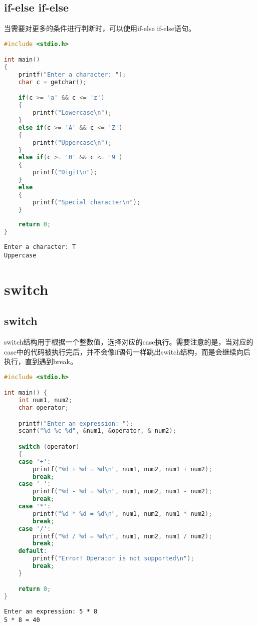 \vspace{0.5cm}

\subsection{if-else if-else}

当需要对更多的条件进行判断时，可以使用if-else if-else语句。\\


\begin{lstlisting}[language=C]
#include <stdio.h>

int main()
{
	printf("Enter a character: ");
	char c = getchar();

	if(c >= 'a' && c <= 'z')
	{
		printf("Lowercase\n");
	}
	else if(c >= 'A' && c <= 'Z')
	{
		printf("Uppercase\n");
	}
	else if(c >= '0' && c <= '9')
	{
		printf("Digit\n");
	}
	else
	{
		printf("Special character\n");
	}
	
	return 0;
}
\end{lstlisting}

\begin{tcolorbox}
	\begin{verbatim}
Enter a character: T
Uppercase
\end{verbatim}
\end{tcolorbox}

\newpage

\section{switch}

\subsection{switch}

switch结构用于根据一个整数值，选择对应的case执行。需要注意的是，当对应的case中的代码被执行完后，并不会像if语句一样跳出switch结构，而是会继续向后执行，直到遇到break。\\


\begin{lstlisting}[language=C]
#include <stdio.h>

int main() {
	int num1, num2;
	char operator;

	printf("Enter an expression: ");
	scanf("%d %c %d", &num1, &operator, & num2);

	switch (operator)
	{
	case '+':
		printf("%d + %d = %d\n", num1, num2, num1 + num2);
		break;
	case '-':
		printf("%d - %d = %d\n", num1, num2, num1 - num2);
		break;
	case '*':
		printf("%d * %d = %d\n", num1, num2, num1 * num2);
		break;
	case '/':
		printf("%d / %d = %d\n", num1, num2, num1 / num2);
		break;
	default:
		printf("Error! Operator is not supported\n");
		break;
	}

	return 0;
}
\end{lstlisting}

\begin{tcolorbox}
	\begin{verbatim}
Enter an expression: 5 * 8
5 * 8 = 40
\end{verbatim}
\end{tcolorbox}

\newpage